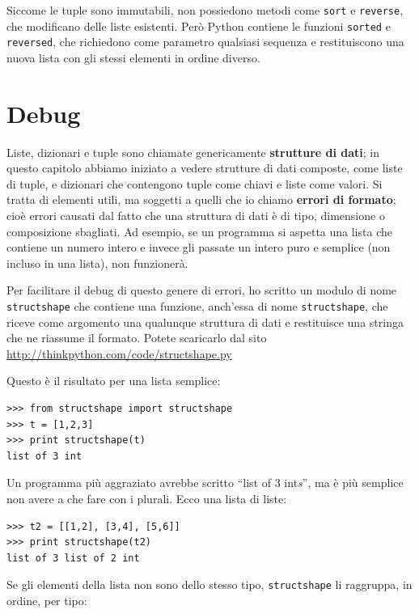 \documentclass[10pt]{book}
\begin{document}
Siccome le tuple sono immutabili, non possiedono metodi come {\tt sort} e {\tt reverse}, che modificano delle liste esistenti.
Però Python contiene le funzioni {\tt sorted} e {\tt reversed}, che richiedono come parametro qualsiasi sequenza e restituiscono una nuova lista con gli stessi elementi in ordine diverso.


\section{Debug}

Liste, dizionari e tuple sono chiamate genericamente {\bf strutture di dati}; in questo capitolo abbiamo iniziato a vedere strutture di dati composte, come liste di tuple, e dizionari che contengono tuple come chiavi e liste come valori. Si tratta di elementi utili, ma soggetti a quelli che io chiamo {\bf errori di formato}; cioè errori causati dal fatto che una struttura di dati è di tipo, dimensione o composizione sbagliati. Ad esempio, se un programma si aspetta una lista che contiene un numero intero e invece gli passate un intero puro e semplice (non incluso in una lista), non funzionerà.


Per facilitare il debug di questo genere di errori, ho scritto un modulo di nome {\tt structshape} che contiene una funzione, anch'essa di nome
{\tt structshape}, che riceve come argomento una qualunque struttura di dati e restituisce una stringa che ne riassume il formato. Potete scaricarlo dal sito \url{http://thinkpython.com/code/structshape.py}

Questo è il risultato per una lista semplice:

\begin{verbatim}
>>> from structshape import structshape
>>> t = [1,2,3]
>>> print structshape(t)
list of 3 int
\end{verbatim}
%
Un programma più aggraziato avrebbe scritto ``list of 3 int{\em s}'', ma è più semplice non avere a che fare con i plurali. Ecco una lista di liste:

\begin{verbatim}
>>> t2 = [[1,2], [3,4], [5,6]]
>>> print structshape(t2)
list of 3 list of 2 int
\end{verbatim}
%
Se gli elementi della lista non sono dello stesso tipo,
{\tt structshape} li raggruppa, in ordine, per tipo:
\end{document}
